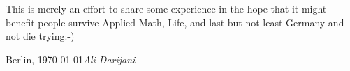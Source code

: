 %
%

\foreword
This is merely an effort to share some experience in the hope that it might benefit people survive 
Applied Math, Life, and last but not least Germany and not die trying:-)

\vspace{\baselineskip}
\begin{flushright}\noindent
Berlin, \today \hfill {\it Ali Darijani}\\
\end{flushright}


